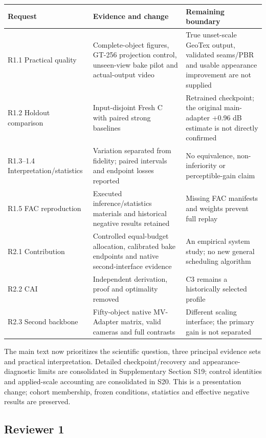 \documentclass[
  10pt,
]{article}
\begin{document}
\begin{longtable}[]{@{}
  >{\raggedright\arraybackslash}p{}
  >{\raggedright\arraybackslash}p{}
  >{\raggedright\arraybackslash}p{}@{}}
\toprule
Request & Evidence and change & Remaining boundary \\
\midrule
\endhead
R1.1 Practical quality & Complete-object figures, GT-256 projection
control, unseen-view bake pilot and actual-output video & True
unset-scale GeoTex output, validated seams/PBR and usable appearance
improvement are not supplied \\
R1.2 Holdout comparison & Input-disjoint Fresh C with paired strong
baselines & Retrained checkpoint; the original main-adapter +0.96 dB
estimate is not directly confirmed \\
R1.3--1.4 Interpretation/statistics & Variation separated from fidelity;
paired intervals and endpoint losses reported & No equivalence,
non-inferiority or perceptible-gain claim \\
R1.5 FAC reproduction & Executed inference/statistics materials and
historical negative results retained & Missing FAC manifests and weights
prevent full replay \\
R2.1 Contribution & Controlled equal-budget allocation, calibrated bake
endpoints and native second-interface evidence & An empirical system
study; no new general scheduling algorithm \\
R2.2 CAI & Independent derivation, proof and optimality removed & C3
remains a historically selected profile \\
R2.3 Second backbone & Fifty-object native MV-Adapter matrix, valid
cameras and full contrasts & Different scaling interface; the primary
gain is not separated \\
\bottomrule
\end{longtable}

The main text now prioritizes the scientific question, three principal
evidence sets and practical interpretation. Detailed checkpoint/recovery
and appearance-diagnostic limits are consolidated in Supplementary
Section S19; control identities and applied-scale accounting are
consolidated in S20. This is a presentation change; cohort membership,
frozen conditions, statistics and effective negative results are
preserved.

\hypertarget{reviewer-1}{%
\subsection{Reviewer 1}\label{reviewer-1}}
\end{document}
